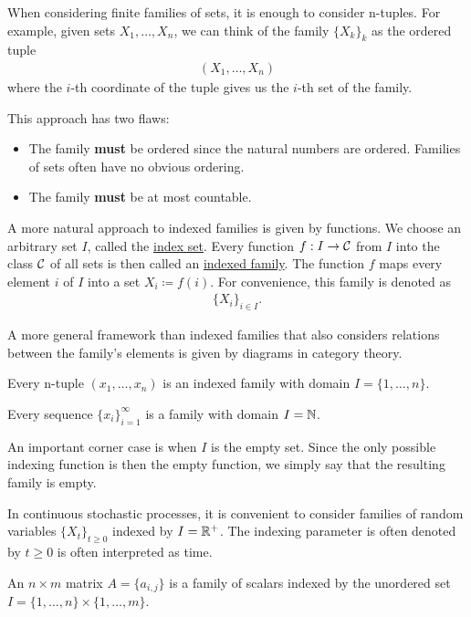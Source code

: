 \begin{definition}\label{def:indexed_family}
  When considering finite families of sets, it is enough to consider n-tuples. For example, given sets $X_1, \ldots, X_n$, we can think of the family $\{ X_k \}_k$ as the ordered tuple
  \begin{align*}
    (X_1, \ldots, X_n)
  \end{align*}
  where the $i$-th coordinate of the tuple gives us the $i$-th set of the family.

  This approach has two flaws:
  \begin{itemize}
    \item The family \textbf{must} be ordered since the natural numbers are ordered. Families of sets often have no obvious ordering.
    \item The family \textbf{must} be at most countable.
  \end{itemize}

  A more natural approach to indexed families is given by functions. We choose an arbitrary set $I$, called the \uline{index set}. Every function $f: I \to \mathcal C$ from $I$ into the class $\cal C$ of all sets is then called an \uline{indexed family}. The function $f$ maps every element $i$ of $I$ into a set $X_i \coloneqq f(i)$. For convenience, this family is denoted as
  \begin{align*}
    \{ X_i \}_{i \in I}.
  \end{align*}

  A more general framework than indexed families that also considers relations between the family's elements is given by diagrams in category theory.
\end{definition}

\begin{example}\label{def:indexed_families}
  \mbox{}
  \begin{defenum}
    \item Every n-tuple $(x_1, \ldots, x_n)$ is an indexed family with domain $I = \{ 1, \ldots, n \}$.

    \item Every sequence $\{ x_i \}_{i=1}^\infty$ is a family with domain $I = \mathbb N$.

    \item An important corner case is when $I$ is the empty set. Since the only possible indexing function is then the empty function, we simply say that the resulting family is empty.

    \item In continuous stochastic processes, it is convenient to consider families of random variables $\{ X_t \}_{t \geq 0}$ indexed by $I = \mathbb R^+$. The indexing parameter is often denoted by $t \geq 0$ is often interpreted as time.

    \item An $n \times m$ matrix $A = \{ a_{i,j} \}$ is a family of scalars indexed by the unordered set $I = \{ 1, \ldots, n \} \times \{ 1, \ldots, m \}$.
  \end{defenum}
\end{example}
